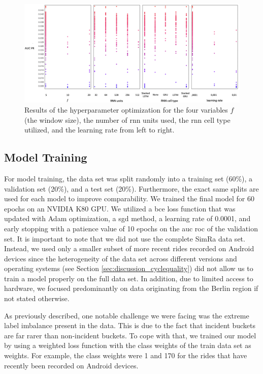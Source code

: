 \begin{figure}[t]
	\centering
	\includegraphics[width=\textwidth]{fig/hpo_results.png}
	\caption{Results of the hyperparameter optimization for the four variables $f$ (the window size), the number of \ac{rnn} units used, the \ac{rnn} cell type utilized, and the learning rate from left to right.}
	\label{fig:hpo}
\end{figure}

\subsection{Model Training}
\label{subsec:model_training}
For model training, the data set was split randomly into a training set (60\%), a validation set (20\%), and a test set (20\%).
Furthermore, the exact same splits are used for each model to improve comparability.
We trained the final model for 60 epochs on an NVIDIA K80 GPU.
We utilized a \ac{bce} loss function that was updated with Adam optimization, a \ac{sgd} method, a learning rate of 0.0001, and early stopping with a patience value of 10 epochs on the \ac{auc} \ac{roc} of the validation set.
It is important to note that we did not use the complete SimRa data set.
Instead, we used only a smaller subset of more recent rides recorded on Android devices since the heterogeneity of the data set across different versions and operating systems (see Section \ref{sec:discussion_cyclequality}) did not allow us to train a model properly on the full data set.
In addition, due to limited access to hardware, we focused predominantly on data originating from the Berlin region if not stated otherwise.

As previously described, one notable challenge we were facing was the extreme label imbalance present in the data.
This is due to the fact that incident buckets are far rarer than non-incident buckets.
To cope with that, we trained our model by using a weighted loss function with the class weights of the train data set as weights.
For example, the class weights were 1 and 170 for the rides that have recently been recorded on Android devices.

